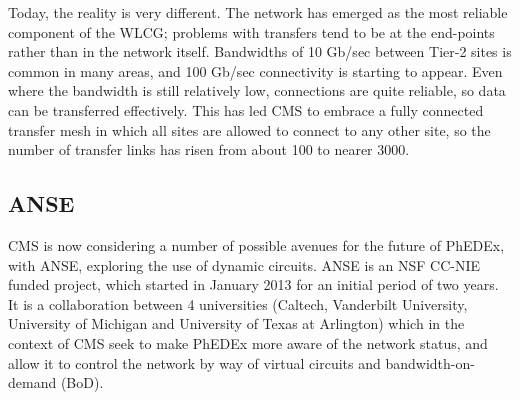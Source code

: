 Today, the reality is very different. The network has emerged as the most reliable 
component of the WLCG; problems with transfers tend to be at the end-points rather 
than in the network itself. Bandwidths of 10 Gb/sec between Tier-2 sites is common 
in many areas, and 100 Gb/sec connectivity is starting to appear. Even where the 
bandwidth is still relatively low, connections are quite reliable, so data can be 
transferred effectively. This has led CMS to embrace a fully connected transfer mesh 
in which all sites are allowed to connect to any other site, so the number of transfer 
links has risen from about 100 to nearer 3000.

\subsection{ANSE}

CMS is now considering a number of possible avenues for the future of PhEDEx\cite{TW_DB_CHEP13},
with ANSE\cite{ANSE}, exploring the use of dynamic circuits. ANSE is an NSF CC-NIE funded project, 
which started in January 2013 for an initial period of two years. It is a collaboration between 
4 universities (Caltech, Vanderbilt University, University of Michigan and University of Texas at 
Arlington) which in the context of CMS seek to make PhEDEx more aware of the network status, 
and allow it to control the network by way of virtual circuits and bandwidth-on-demand (BoD).